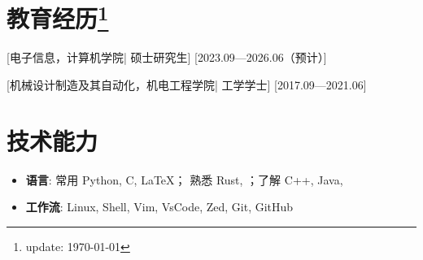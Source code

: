 \documentclass{resume}
\begin{document}


\ResumeTitle

\section[教育经历]{教育经历\protect\footnote{update: \today}}
[\textnormal{电子信息，计算机学院|}  硕士研究生]
[2023.09—2026.06（预计）]

[\textnormal{机械设计制造及其自动化，机电工程学院|} 工学学士]
[2017.09—2021.06]

\section[技术能力]{技术能力\protect}
\begin{itemize}
  \item \textbf{语言}: 常用 Python, C, \LaTeX； 熟悉 Rust, ；了解 C++, Java, 
  \item \textbf{工作流}: Linux, Shell, Vim, VsCode, Zed, Git, GitHub
\end{itemize}



\end{document}
